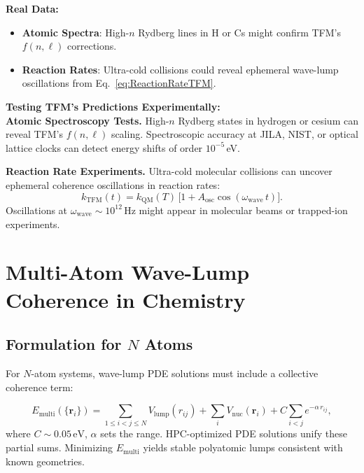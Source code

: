 \documentclass[12pt]{article}
\begin{document}
\textbf{Real Data:} 
\begin{itemize}
  \item \textbf{Atomic Spectra}: High-$n$ Rydberg lines in H or Cs \cite{Parthey2011Nature} might confirm TFM’s $f(n,\ell)$ corrections.
  \item \textbf{Reaction Rates}: Ultra-cold collisions \cite{Jin2019Science} could reveal ephemeral wave-lump oscillations from Eq.~\eqref{eq:ReactionRateTFM}.
\end{itemize}

\bigskip
\noindent
\textbf{Testing TFM’s Predictions Experimentally:}\\[5pt]
\textbf{Atomic Spectroscopy Tests.}  
High-$n$ Rydberg states in hydrogen or cesium can reveal TFM’s $f(n,\ell)$ scaling.  
Spectroscopic accuracy at JILA, NIST, or optical lattice clocks can detect energy shifts of order $10^{-5}$\,eV.

\smallskip
\noindent
\textbf{Reaction Rate Experiments.}  
Ultra-cold molecular collisions can uncover ephemeral coherence oscillations in reaction rates:
\[
k_{\mathrm{TFM}}(t)
=
k_{\mathrm{QM}}(T)\,
\bigl[
1 + A_{\mathrm{osc}}\cos(\omega_{\mathrm{wave}}\,t)
\bigr].
\]
Oscillations at $\omega_{\mathrm{wave}}\sim10^{12}\,\mathrm{Hz}$ might appear in molecular beams or trapped-ion experiments.

\section{Multi-Atom Wave-Lump Coherence in Chemistry}
\label{sec:MultiAtomCoherence}

\subsection{Formulation for \boldmath$N$ Atoms}
For $N$-atom systems, wave-lump PDE solutions must include a collective coherence term:

\begin{equation}
  E_{\mathrm{multi}}(\{\mathbf{r}_i\})
  =
  \sum_{1 \le i < j \le N} 
  V_{\mathrm{lump}}(r_{ij})
  + 
  \sum_{i} V_{\mathrm{nuc}}(\mathbf{r}_i)
  + 
  C \sum_{i<j} e^{-\alpha\,r_{ij}},
  \label{eq:multiAtomEqRefined}
\end{equation}
where $C\sim0.05\,\mathrm{eV}$, $\alpha$ sets the range. HPC-optimized PDE solutions unify these partial sums. Minimizing $E_{\mathrm{multi}}$ yields stable polyatomic lumps consistent with known geometries.
\end{document}
